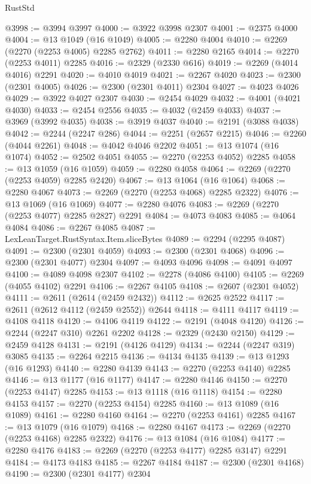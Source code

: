\begin{lexlean}{RustStd}
\begin{coremodule}
@3998 := @3994 @3997
@4000 := @3922 @3998 @2307
@4001 := @2375 @4000
@4004 := @13 @1049 (@16 @1049)
@4005 := @2280 @4004
@4010 := @2269 (@2270 (@2253 @4005) @2285 @2762)
@4011 := @2280 @2165
@4014 := @2270 (@2253 @4011) @2285
@4016 := @2329 (@2330 @616)
@4019 := @2269 (@4014 @4016) @2291
@4020 := @4010 @4019
@4021 := @2267 @4020
@4023 := @2300 (@2301 @4005)
@4026 := @2300 (@2301 @4011) @2304
@4027 := @4023 @4026
@4029 := @3922 @4027 @2307
@4030 := @2454 @4029
@4032 := @4001 (@4021 @4030)
@4033 := @2454 @2556
@4035 := @4032 (@2459 @4033)
@4037 := @3969 (@3992 @4035)
@4038 := @3919 @4037
@4040 := @2191 (@3088 @4038)
@4042 := @2244 (@2247 @286)
@4044 := @2251 (@2657 @2215)
@4046 := @2260 (@4044 @2261)
@4048 := @4042 @4046 @2202
@4051 := @13 @1074 (@16 @1074)
@4052 := @2502 @4051
@4055 := @2270 (@2253 @4052) @2285
@4058 := @13 @1059 (@16 @1059)
@4059 := @2280 @4058
@4064 := @2269 (@2270 (@2253 @4059) @2285 @2420)
@4067 := @13 @1064 (@16 @1064)
@4068 := @2280 @4067
@4073 := @2269 (@2270 (@2253 @4068) @2285 @2322)
@4076 := @13 @1069 (@16 @1069)
@4077 := @2280 @4076
@4083 := @2269 (@2270 (@2253 @4077) @2285 @2827) @2291
@4084 := @4073 @4083
@4085 := @4064 @4084
@4086 := @2267 @4085
@4087 := LexLeanTarget.RustSyntax.Item.sliceBytes
@4089 := @2294 (@2295 @4087)
@4091 := @2300 (@2301 @4059)
@4093 := @2300 (@2301 @4068)
@4096 := @2300 (@2301 @4077) @2304
@4097 := @4093 @4096
@4098 := @4091 @4097
@4100 := @4089 @4098 @2307
@4102 := @2278 (@4086 @4100)
@4105 := @2269 (@4055 @4102) @2291
@4106 := @2267 @4105
@4108 := @2607 (@2301 @4052)
@4111 := @2611 (@2614 (@2459 @2432))
@4112 := @2625 @2522
@4117 := @2611 (@2612 @4112 (@2459 @2552)) @2644
@4118 := @4111 @4117
@4119 := @4108 @4118
@4120 := @4106 @4119
@4122 := @2191 (@4048 @4120)
@4126 := @2244 (@2247 @310) @2261 @2202
@4128 := @2329 (@2430 @2150)
@4129 := @2459 @4128
@4131 := @2191 (@4126 @4129)
@4134 := @2244 (@2247 @319) @3085
@4135 := @2264 @2215
@4136 := @4134 @4135
@4139 := @13 @1293 (@16 @1293)
@4140 := @2280 @4139
@4143 := @2270 (@2253 @4140) @2285
@4146 := @13 @1177 (@16 @1177)
@4147 := @2280 @4146
@4150 := @2270 (@2253 @4147) @2285
@4153 := @13 @1118 (@16 @1118)
@4154 := @2280 @4153
@4157 := @2270 (@2253 @4154) @2285
@4160 := @13 @1089 (@16 @1089)
@4161 := @2280 @4160
@4164 := @2270 (@2253 @4161) @2285
@4167 := @13 @1079 (@16 @1079)
@4168 := @2280 @4167
@4173 := @2269 (@2270 (@2253 @4168) @2285 @2322)
@4176 := @13 @1084 (@16 @1084)
@4177 := @2280 @4176
@4183 := @2269 (@2270 (@2253 @4177) @2285 @3147) @2291
@4184 := @4173 @4183
@4185 := @2267 @4184
@4187 := @2300 (@2301 @4168)
@4190 := @2300 (@2301 @4177) @2304

\end{coremodule}
\end{lexlean}
